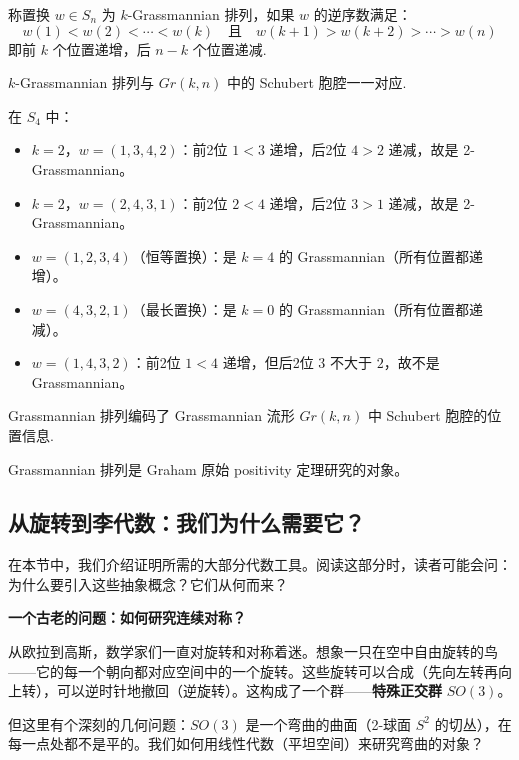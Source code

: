 \begin{Definition}[Grassmannian 排列]
\label{def:GrassmannianPermutation}
称置换 $w \in S_n$ 为 $k$-Grassmannian 排列，如果 $w$ 的逆序数满足：
\begin{equation}
w(1) < w(2) < \cdots < w(k) \quad \text{且} \quad w(k+1) > w(k+2) > \cdots > w(n)
\end{equation}
即前 $k$ 个位置递增，后 $n-k$ 个位置递减.

$k$-Grassmannian 排列与 $Gr(k, n)$ 中的 Schubert 胞腔一一对应.
\end{Definition}

\begin{Example}
\label{ex:GrassmannianPermutation}
在 $S_4$ 中：
\begin{itemize}
\item $k=2$，$w = (1,3,4,2)$：前2位 $1<3$ 递增，后2位 $4>2$ 递减，故是 2-Grassmannian。
\item $k=2$，$w = (2,4,3,1)$：前2位 $2<4$ 递增，后2位 $3>1$ 递减，故是 2-Grassmannian。
\item $w = (1,2,3,4)$（恒等置换）：是 $k=4$ 的 Grassmannian（所有位置都递增）。
\item $w = (4,3,2,1)$（最长置换）：是 $k=0$ 的 Grassmannian（所有位置都递减）。
\item $w = (1,4,3,2)$：前2位 $1<4$ 递增，但后2位 $3$ 不大于 $2$，故不是 Grassmannian。
\end{itemize}
Grassmannian 排列编码了 Grassmannian 流形 $Gr(k, n)$ 中 Schubert 胞腔的位置信息.
\end{Example}

Grassmannian 排列是 Graham 原始 positivity 定理研究的对象。

\subsection{从旋转到李代数：我们为什么需要它？}

在本节中，我们介绍证明所需的大部分代数工具。阅读这部分时，读者可能会问：为什么要引入这些抽象概念？它们从何而来？

\bigskip
\noindent\textbf{一个古老的问题：如何研究连续对称？}

从欧拉到高斯，数学家们一直对旋转和对称着迷。想象一只在空中自由旋转的鸟——它的每一个朝向都对应空间中的一个旋转。这些旋转可以合成（先向左转再向上转），可以逆时针地撤回（逆旋转）。这构成了一个群——\textbf{特殊正交群} $SO(3)$。

但这里有个深刻的几何问题：$SO(3)$ 是一个弯曲的曲面（2-球面 $S^2$ 的切丛），在每一点处都不是平的。我们如何用线性代数（平坦空间）来研究弯曲的对象？

